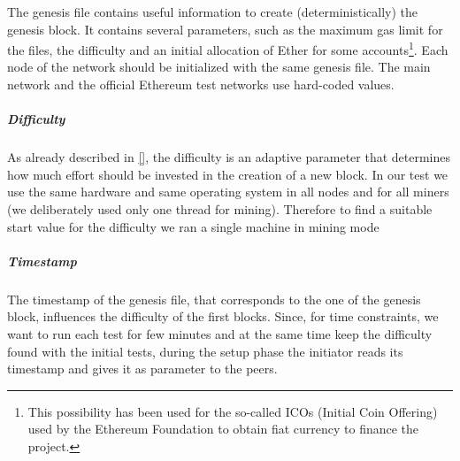 The genesis file contains useful information to create (deterministically)
the genesis block. It contains several parameters, such as the maximum
gas limit for the files, the difficulty and an initial allocation of Ether
for some accounts\footnote{This possibility has been used for the so-called
ICOs (Initial Coin Offering) used by the Ethereum Foundation to obtain fiat
currency to finance the project.}. Each node of the network should be 
initialized with the same genesis file. 
The main network and the official Ethereum test
networks use hard-coded values.


\subparagraph{Difficulty}
As already described in \autoref{}, the difficulty is an adaptive parameter 
that determines how much effort should be invested in the creation of a new
block.
In our test we use the same hardware and same operating system in all nodes
and for all miners (we deliberately used only one thread for mining).
Therefore to find a suitable start value for the difficulty we ran a single
machine in mining mode 


\subparagraph{Timestamp}
The timestamp of the genesis file, that corresponds to the one of the genesis
block, influences the difficulty of the first blocks.
Since, for time constraints, we want to run each test for few minutes and
at the same time keep the difficulty found with the initial tests,
during the setup phase the initiator reads its timestamp and gives it
as parameter to the peers.


